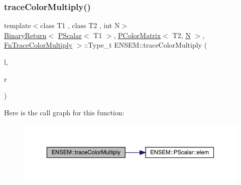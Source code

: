 \subsubsection{\texorpdfstring{traceColorMultiply()}{traceColorMultiply()}\hspace{0.1cm}{\footnotesize\ttfamily [3/3]}}
{\footnotesize\ttfamily template$<$class T1 , class T2 , int N$>$ \\
\mbox{\hyperlink{structENSEM_1_1BinaryReturn}{Binary\+Return}}$<$ \mbox{\hyperlink{classENSEM_1_1PScalar}{P\+Scalar}}$<$ T1 $>$, \mbox{\hyperlink{classENSEM_1_1PColorMatrix}{P\+Color\+Matrix}}$<$ T2, \mbox{\hyperlink{operator__name__util_8cc_a7722c8ecbb62d99aee7ce68b1752f337}{N}} $>$, \mbox{\hyperlink{structENSEM_1_1FnTraceColorMultiply}{Fn\+Trace\+Color\+Multiply}} $>$\+::Type\+\_\+t E\+N\+S\+E\+M\+::trace\+Color\+Multiply (\begin{DoxyParamCaption}\item[{const \mbox{\hyperlink{classENSEM_1_1PScalar}{P\+Scalar}}$<$ T1 $>$ \&}]{l,  }\item[{const \mbox{\hyperlink{classENSEM_1_1PColorMatrix}{P\+Color\+Matrix}}$<$ T2, \mbox{\hyperlink{operator__name__util_8cc_a7722c8ecbb62d99aee7ce68b1752f337}{N}} $>$ \&}]{r }\end{DoxyParamCaption})\hspace{0.3cm}{\ttfamily [inline]}}

Here is the call graph for this function\+:\nopagebreak
\begin{figure}[H]
\begin{center}
\leavevmode
\includegraphics[width=350pt]{dd/d2f/group__primcolormatrix_ga0e0db533c0e6dc778fc9f271537b96eb_cgraph}
\end{center}
\end{figure}
\mbox{\label{group__primcolormatrix_gad27a30bd1b98827095b42464443c9ffc}} 
